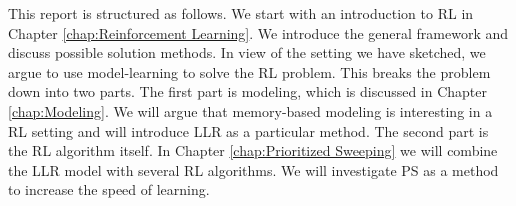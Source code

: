 This report is structured as follows. We start with an introduction to \ac{RL} in Chapter \ref{chap:Reinforcement Learning}. We introduce the general framework and discuss possible solution methods. In view of the setting we have sketched, we argue to use model-learning to solve the \ac{RL} problem. This breaks the problem down into two parts. The first part is modeling, which is discussed in Chapter \ref{chap:Modeling}. We will argue that memory-based modeling is interesting in a \ac{RL} setting and will introduce \ac{LLR} as a particular method. The second part is the \ac{RL} algorithm itself. In Chapter \ref{chap:Prioritized Sweeping} we will combine the \ac{LLR} model with several \ac{RL} algorithms. We will investigate \ac{PS} as a method to increase the speed of learning.







